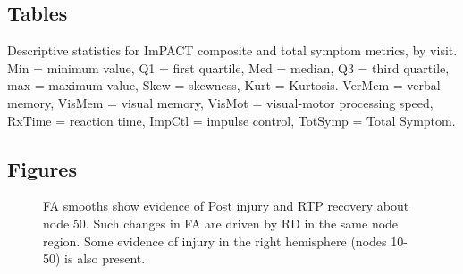 \documentclass[12pt]{article}
\begin{document}
\subsection{Tables}
\label{ssec:supp-tables}
\begin{table}[H]
	\scriptsize
	
	\caption{Descriptive statistics for ImPACT composite and total symptom metrics, by visit. Min = minimum value, Q1 = first quartile, Med = median, Q3 = third quartile, max = maximum value, Skew = skewness, Kurt = Kurtosis. VerMem = verbal memory, VisMem = visual memory, VisMot = visual-motor processing speed, RxTime = reaction time, ImpCtl = impulse control, TotSymp = Total Symptom.}
	\label{supp-tbl:imp-desc}
\end{table}


\subsection{Figures}
\label{ssec:supp-figures}

\begin{figure}[H]
	\centering
	\caption{FA smooths show evidence of Post injury and RTP recovery about node 50. Such changes in FA are driven by RD in the same node region. Some evidence of injury in the right hemisphere (nodes 10-50) is also present.}
	\label{supp-fig:lgio-gam-recov}
\end{figure}
\end{document}
